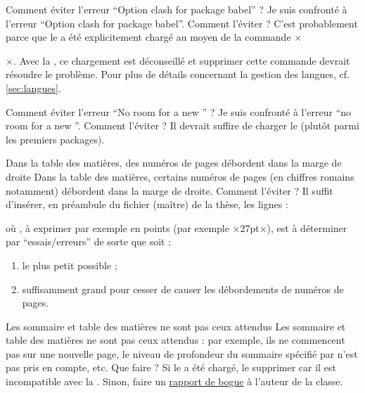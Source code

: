 \begin{dbfaq}{Comment éviter l'erreur \enquote{Option clash for package babel} ?}{}
  Je suis confronté à l'erreur \enquote{Option clash for package
    babel}. Comment l'éviter ?
  \tcblower
  C'est probablement parce que le  a été explicitement chargé au
  moyen de la commande ×\usepackage[...]{babel}×. Avec la \yatcl{}, ce
  chargement est déconseillé et supprimer cette commande devrait résoudre le
  problème. Pour plus de détails concernant la gestion des langues,
  cf. \vref{sec:langues}.
\end{dbfaq}

\begin{dbfaq}{Comment éviter l'erreur \enquote{No room for a new
      \protect{}} ?}{}
  Je suis confronté à l'erreur \enquote{no room for a new
    }. Comment l'éviter ?
  \tcblower
  Il devrait suffire de charger le  (plutôt parmi les
  premiers packages).
\end{dbfaq}

\begin{dbfaq}{Dans la table des matières, des numéros de pages débordent dans
    la marge de droite}{}
  Dans la table des matières, certains numéros de pages (en chiffres romains
  notamment) débordent dans la marge de droite. Comment l'éviter ?
  \tcblower
  Il suffit d'insérer, en préambule du fichier (maître) de la thèse, les
  lignes :
\begin{preamblecode}
\makeatletter
\renewcommand*\@pnumwidth{÷\meta{distance}÷}
\makeatother
\end{preamblecode}
où , à exprimer par exemple en points (par exemple ×27pt×), est
à déterminer par \enquote{essais/erreurs} de sorte que  soit :
\begin{enumerate}
\item le plus petit possible ;
\item suffisamment grand pour cesser de causer les débordements de numéros de
  pages.
\end{enumerate}
\end{dbfaq}

\begin{dbfaq}{Les sommaire et table des matières ne sont pas ceux attendus}{}
  Les sommaire et table des matières ne sont pas ceux attendus : par exemple,
  ils ne commencent pas sur une nouvelle page, le niveau de profondeur du
  sommaire spécifié par  n'est pas pris en compte, etc. Que faire ?
  \tcblower
  Si le  a été chargé, le supprimer car il est incompatible
  avec la \yatcl{}. Sinon, faire un \hyperref[faq:bogues]{rapport de bogue}
  à l'auteur de la classe.
\end{dbfaq}


%
\iffalse
\fi
